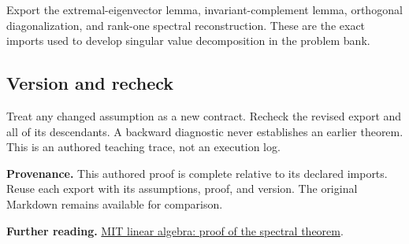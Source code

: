 \documentclass[preprint,12pt,aps,pra,showkeys,amsmath,amssymb,superscriptaddress,floatfix]{revtex4-2}
\theoremstyle{definition}
\theoremstyle{remark}
\begin{document}
Export the extremal-eigenvector lemma, invariant-complement lemma,
orthogonal diagonalization, and rank-one spectral reconstruction. These
are the exact imports used to develop singular value decomposition in
the problem bank.

\subsection{Version and recheck}
Treat any changed assumption as a new contract. Recheck the revised
export and all of its descendants. A backward diagnostic never
establishes an earlier theorem. This is an authored teaching trace, not
an execution log.

\par\medskip\begingroup\small\linespread{1.0}\selectfont\noindent\textbf{Provenance.} This authored proof is complete relative to its declared imports. Reuse
each export with its assumptions, proof, and version. The original
Markdown remains available for comparison.
\par\endgroup

\par\smallskip\begingroup\small\linespread{1.0}\selectfont\noindent\textbf{Further reading.} \href{https://ocw.mit.edu/courses/18-700-linear-algebra-fall-2013/pages/study-materials/}{MIT
linear algebra: proof of the spectral theorem}.\par\endgroup
\end{document}
